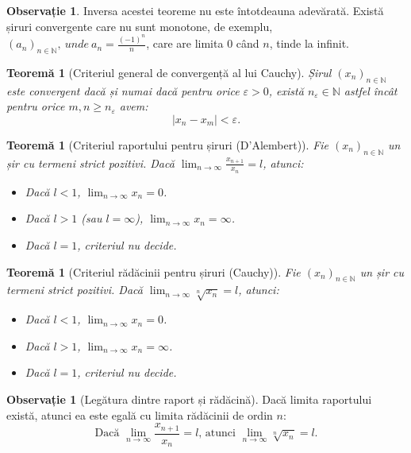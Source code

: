 \documentclass[11pt,a4paper]{article}
\theoremstyle{definition}
\newtheorem{remark}[definition]{Observație}
\theoremstyle{plain}
\newtheorem{theorem}[definition]{Teoremă}
\theoremstyle{remark}
\newcommand{\N}{\mathbb{N}}
\newcommand{\eps}{\varepsilon}
\begin{document}
\begin{remark}
    Inversa acestei teoreme nu este întotdeauna adevărată. Există șiruri convergente care nu sunt monotone, de exemplu, $(a_n)_{n \in \mathbb{N}}, \ unde\  a_n = \frac{(-1)^n}{n}$, care are limita $0$ când $n$, tinde la infinit.
\end{remark}

\begin{theorem}[Criteriul general de convergență al lui Cauchy]
    Șirul $(x_n)_{n \in \N}$ este convergent dacă și numai dacă pentru orice $\eps > 0$, există $n_\eps \in \N$ astfel încât pentru orice $m, n \ge n_\eps$ avem:
    \[
        |x_n - x_m| < \eps.
    \]
\end{theorem}

\begin{theorem}[Criteriul raportului pentru șiruri (D'Alembert)]
    Fie $(x_n)_{n \in \N}$ un șir cu termeni strict pozitivi. Dacă $\lim_{n \to \infty} \frac{x_{n+1}}{x_n} = l$, atunci:
    \begin{itemize}
        \item Dacă $l < 1$, $\lim_{n \to \infty} x_n = 0$.
        \item Dacă $l > 1$ (sau $l = \infty$), $\lim_{n \to \infty} x_n = \infty$.
        \item Dacă $l = 1$, criteriul nu decide.
    \end{itemize}
\end{theorem}

\begin{theorem}[Criteriul rădăcinii pentru șiruri (Cauchy)]
    Fie $(x_n)_{n \in \N}$ un șir cu termeni strict pozitivi. Dacă $\lim_{n \to \infty} \sqrt[n]{x_n} = l$, atunci:
    \begin{itemize}
        \item Dacă $l < 1$, $\lim_{n \to \infty} x_n = 0$.
        \item Dacă $l > 1$, $\lim_{n \to \infty} x_n = \infty$.
        \item Dacă $l = 1$, criteriul nu decide.
    \end{itemize}
\end{theorem}

\begin{remark}[Legătura dintre raport și rădăcină]
    Dacă limita raportului există, atunci ea este egală cu limita rădăcinii de ordin $n$:
    \[
        \text{Dacă } \lim_{n \to \infty} \frac{x_{n+1}}{x_n} = l \text{, atunci } \lim_{n \to \infty} \sqrt[n]{x_n} = l.
    \]
\end{remark}
\end{document}

